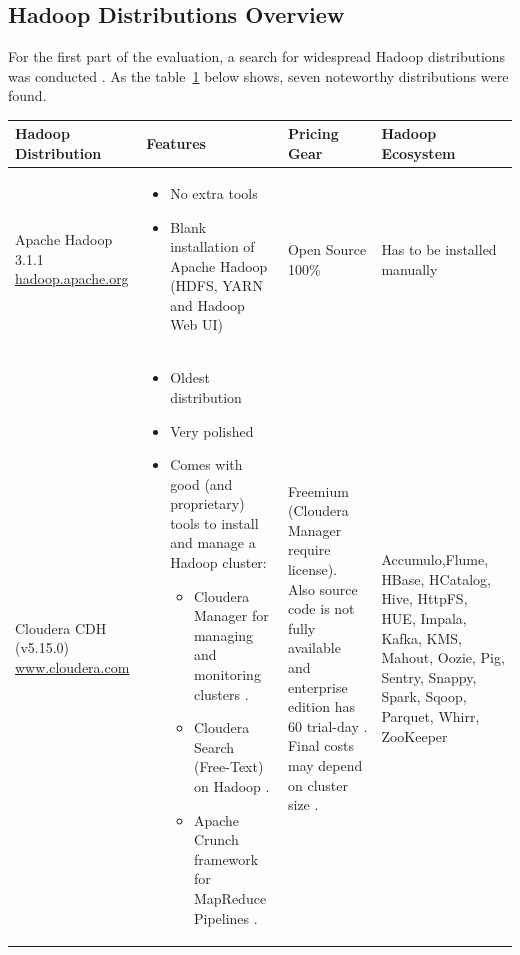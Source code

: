 \subsection{Hadoop Distributions Overview}\label{hd}
For the first part of the evaluation, a search for widespread Hadoop distributions was conducted \citep{hadoopvendors,forrester,comparison2014,Cloudera,M.Heo2015}.
As the table~\ref{tab:distributions} below shows, seven noteworthy distributions were found.
\begin{table}[H]
\hspace{-3.3cm}
\begin{tabular}{|p{4.4cm}|p{6.2cm}|p{4cm}|p{4cm}|}
	\hline
	\textbf{Hadoop \newline Distribution} & \textbf{Features} & \textbf{ Pricing Gear}  & \textbf{ Hadoop \newline Ecosystem}\\ \hline
	Apache Hadoop 3.1.1
\href{http://hadoop.apache.org/}{hadoop.apache.org} & 
\begin{itemize}[noitemsep,leftmargin=*]
   \item No extra tools
   \item Blank installation of Apache Hadoop (HDFS, YARN and Hadoop Web UI)
\end{itemize}
& Open Source 100\% & Has to be
installed
manually \citep{apachehadoop}\\ \hline
Cloudera CDH (v5.15.0)
\href{https://www.cloudera.com/}{www.cloudera.com} & \begin{itemize}[noitemsep,leftmargin=*]
   \item Oldest distribution
   \item Very polished
   \item Comes with good (and proprietary)
tools to install and manage a Hadoop
cluster: \begin{itemize}
\item Cloudera Manager for managing
and monitoring clusters \citep{Cloudera2018a}.
\item Cloudera Search (Free-Text) on
Hadoop \citep{Cloudera2018}.
\item Apache Crunch framework for
MapReduce Pipelines \citep{Cloudera2018}.
\end{itemize}
\end{itemize} &Freemium (Cloudera Manager require license). Also source code is not fully available and enterprise edition has 60 trial-day \citep{D.Kumar2016}. Final costs may depend on cluster size \citep{Cloudera}.  &Accumulo,Flume, HBase, HCatalog, Hive, HttpFS, HUE, Impala, Kafka, KMS, Mahout, Oozie, Pig, Sentry, Snappy, Spark, Sqoop, Parquet, Whirr, ZooKeeper \citep{Cloudera2018a,Cloudera2018}\\ \hline
\end{tabular}
\label{tab:distributions}
\end{table}
